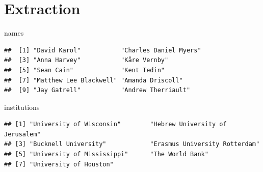 \documentclass[ignorenonframetext,]{beamer}
\newenvironment{Shaded}{\begin{snugshade}}{\end{snugshade}}
\newcommand{\KeywordTok}[1]{\textcolor[rgb]{0.13,0.29,0.53}{\textbf{{#1}}}}
\newcommand{\DecValTok}[1]{\textcolor[rgb]{0.00,0.00,0.81}{{#1}}}
\newcommand{\CharTok}[1]{\textcolor[rgb]{0.31,0.60,0.02}{{#1}}}
\newcommand{\StringTok}[1]{\textcolor[rgb]{0.31,0.60,0.02}{{#1}}}
\newcommand{\NormalTok}[1]{{#1}}
\begin{document}
\section{Extraction}\label{extraction}

\begin{frame}[fragile]{names}

\begin{Shaded}
\end{Shaded}

\begin{verbatim}
##  [1] "David Karol"           "Charles Daniel Myers" 
##  [3] "Anna Harvey"           "Kåre Vernby"          
##  [5] "Sean Cain"             "Kent Tedin"           
##  [7] "Matthew Lee Blackwell" "Amanda Driscoll"      
##  [9] "Jay Gatrell"           "Andrew Therriault"
\end{verbatim}

\end{frame}

\begin{frame}[fragile]{institutions}

\begin{Shaded}
\end{Shaded}

\begin{verbatim}
## [1] "University of Wisconsin"        "Hebrew University of Jerusalem"
## [3] "Bucknell University"            "Erasmus University Rotterdam"  
## [5] "University of Mississippi"      "The World Bank"                
## [7] "University of Houston"
\end{verbatim}

\end{frame}
\end{document}
